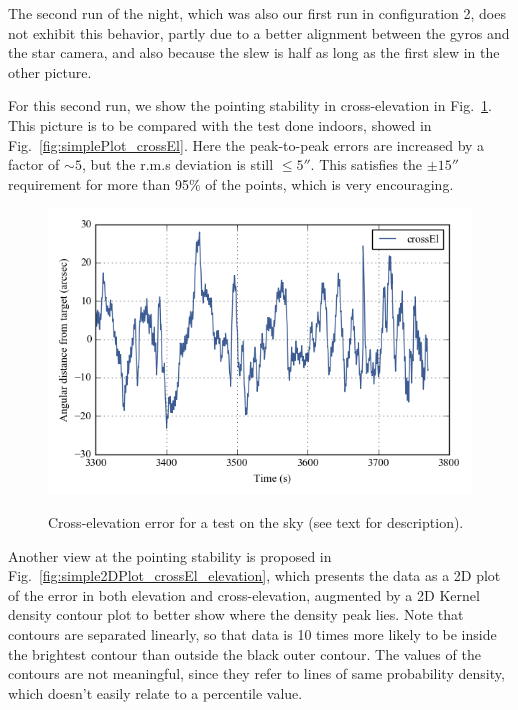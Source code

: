 The second run of the night, which was also our first run in configuration 2, does not exhibit this behavior, partly due to a better alignment between the gyros and the star camera, and also because the slew is half as long as the first slew in the other picture. 

For this second run, we show the pointing stability in cross-elevation in Fig.~\ref{fig:crossEl_outside}. This picture is to be compared with the test done indoors, showed in Fig.~\ref{fig:simplePlot_crossEl}. Here the peak-to-peak errors are increased by a factor of $\sim 5$, but the r.m.s deviation is still $\le\ang{;;5}$. This satisfies the $\pm\ang{;;15}$ requirement for more than 95\% of the points, which is very encouraging.
\begin{figure}[!h]
\begin{center}
\includegraphics{Figures/crossEl_outside.png}
\label{fig:crossEl_outside}
\vspace{-0.5cm}
\caption[Cross-elevation error]{Cross-elevation error for a test on the sky (see text for description).}
\end{center}
\end{figure}

Another view at the pointing stability is proposed in Fig.~\ref{fig:simple2DPlot_crossEl_elevation}, which presents the data as a 2D plot of the error in both elevation and cross-elevation, augmented by a 2D Kernel density contour plot to better show where the density peak lies. Note that contours are separated linearly, so that data is 10 times more likely to be inside the brightest contour than outside the black outer contour. The values of the contours are not meaningful, since they refer to lines of same probability density, which doesn't easily relate to a percentile value. 

